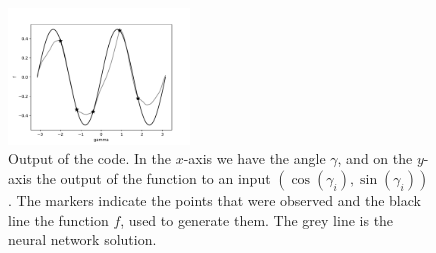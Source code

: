 \documentclass[a4paper,10pt]{article}
\begin{document}
\begin{figure}[H]
    \centering
    \includegraphics[width=0.43\textwidth]{img/neural_network.pdf}
    \caption{Output of the code. In the $x$-axis we have the angle $\gamma$, and on the $y$-axis the output of the function to an input $(\cos(\gamma_i), \sin(\gamma_i))$. The markers indicate the points that were observed and the black line the function $f$, used to generate them. The grey line is the neural network solution. }
    \label{fig:nn}
\end{figure}
\end{document}
